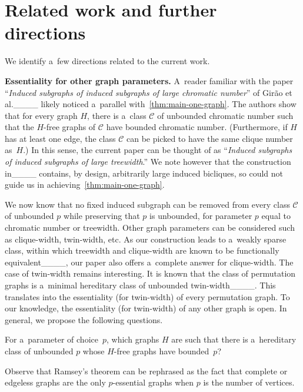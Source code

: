 \section{Related work and further directions}
We identify a~few directions related to the current work.

\medskip
\textbf{Essentiality for other graph parameters.}
A~reader familiar with the paper ``\emph{Induced subgraphs of induced subgraphs of large chromatic number}'' of Gir\~ao et al.____ likely noticed a~parallel with~\cref{thm:main-one-graph}.
The authors show that for every graph $H$, there is a~class $\mathcal C$ of unbounded chromatic number such that the \mbox{$H$-free} graphs of $\mathcal C$ have bounded chromatic number. 
(Furthermore, if $H$ has at least one edge, the class $\mathcal C$ can be picked to have the same clique number as~$H$.)
In this sense, the current paper can be thought of as ``\emph{Induced subgraphs of induced subgraphs of large treewidth}.''
We note however that the construction in____ contains, by design, arbitrarily large induced bicliques, so could not guide us in achieving~\cref{thm:main-one-graph}.

We now know that no fixed induced subgraph can be removed from every class $\mathcal C$ of unbounded $p$ while preserving that $p$ is unbounded, for parameter $p$ equal to chromatic number or treewidth.  
Other graph parameters can be considered such as clique-width, twin-width, etc.
As our construction leads to a~weakly sparse class, within which treewidth and clique-width are known to be functionally equivalent____, our paper also offers a~complete answer for clique-width.
The case of twin-width remains interesting.
It is known that the class of permutation graphs is a~minimal hereditary class of unbounded twin-width____.
This translates into the essentiality (for twin-width) of every permutation graph.
To our knowledge, the essentiality (for twin-width) of any other graph is open.  
In general, we propose the following questions.

\begin{meta-problem}
  For a~parameter of choice~$p$, which graphs $H$ are such that there is a~hereditary class of unbounded $p$ whose $H$-free graphs have bounded~$p$?
\end{meta-problem}

Observe that Ramsey's theorem can be rephrased as the fact that complete or edgeless graphs are the only $p$-essential graphs when $p$ is the number of vertices.

